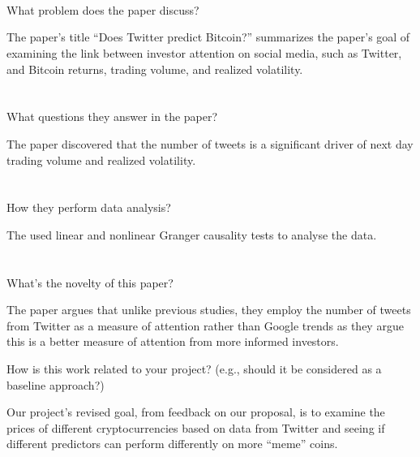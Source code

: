 \documentclass[
  coursecode={CMPE 351},
  assignmentname={Paper Review},
  studentnumber=20053722,
  name={Bryan Hoang (16bch1)},
  draft,
  final,
]{
  ltxanswer%
}
\begin{document}
\begin{questions}
    \question\
    \begin{parts}
      \part{} What problem does the paper discuss?
      \begin{solution}
        The paper's title ``Does Twitter predict Bitcoin?'' summarizes the paper's goal of examining the link between investor attention on social media, such as Twitter, and Bitcoin returns, trading volume, and realized volatility.
      \end{solution}

      \part{} What questions they answer in the paper?
      \begin{solution}
        The paper discovered that the number of tweets is a significant driver of next day trading volume and realized volatility.
      \end{solution}

      \part{} How they perform data analysis?
      \begin{solution}
        The used linear and nonlinear Granger causality tests to analyse the data.
      \end{solution}

      \part{} What's the novelty of this paper?
      \begin{solution}
        The paper argues that unlike previous studies, they employ the number of tweets from Twitter as a measure of attention rather than Google trends as they argue this is a better measure of attention from more informed investors.
      \end{solution}
    \end{parts}

    \question{} How is this work related to your project? (e.g., should it be considered as a baseline approach?)
    \begin{solution}
      Our project's revised goal, from feedback on our proposal, is to examine the prices of different cryptocurrencies based on data from Twitter and seeing if different predictors can perform differently on more ``meme'' coins.


\end{solution}
\end{questions}
\end{document}

